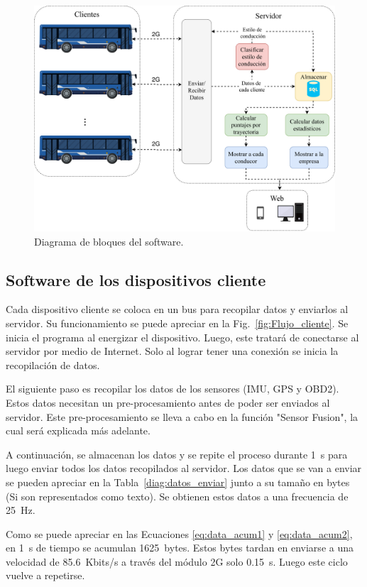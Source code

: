 \begin{figure}[hbtp!]
\centering
\includegraphics[width=\textwidth]{Bloques_software.pdf}
\caption{Diagrama de bloques del software.}
\label{fig:Bloques_software}
\end{figure}

\subsection{Software de los dispositivos cliente}

Cada dispositivo cliente se coloca en un bus para recopilar datos y enviarlos al servidor. Su funcionamiento se puede apreciar en la Fig.~\ref{fig:Flujo_cliente}. Se inicia el programa al energizar el dispositivo. Luego, este tratará de conectarse al servidor por medio de Internet. Solo al lograr tener una conexión se inicia la recopilación de datos.

El siguiente paso es recopilar los datos de los sensores (IMU, GPS y OBD2). Estos datos necesitan un pre-procesamiento antes de poder ser enviados al servidor. Este pre-procesamiento se lleva a cabo en la función "Sensor Fusion", la cual será explicada más adelante.

A continuación, se almacenan los datos y se repite el proceso durante \SI{1}{s} para luego enviar todos los datos recopilados al servidor. Los datos que se van a enviar se pueden apreciar en la Tabla~\ref{diag:datos_enviar} junto a su tamaño en bytes (Si son representados como texto). Se obtienen estos datos a una frecuencia de \SI{25}{Hz}.

Como se puede apreciar en las Ecuaciones \ref{eq:data_acum1} y \ref{eq:data_acum2}, en \SI{1}{s} de tiempo se acumulan \SI{1625}{bytes}. Estos bytes tardan en enviarse a una velocidad de \SI{85.6}{Kbits/s} a través del módulo 2G solo \SI{0.15}{s}. Luego este ciclo vuelve a repetirse.



